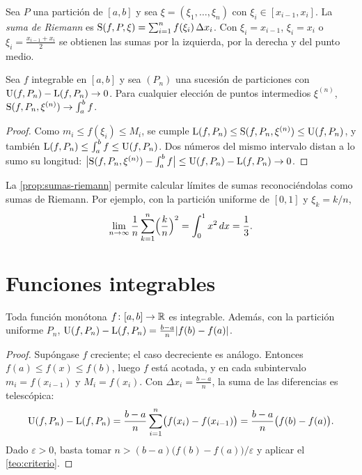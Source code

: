 \begin{definicion}\label{def:suma-riemann}
Sea $P$ una partición de $[a,b]$ y sea $\xi=(\xi_1,\dots,\xi_n)$ con $\xi_i\in[x_{i-1},x_i]$. La \emph{suma de Riemann} es $\operatorname{S}(f,P,\xi)=\sum_{i=1}^{n}f(\xi_i)\,\Delta x_i$. Con $\xi_i=x_{i-1}$, $\xi_i=x_i$ o $\xi_i=\frac{x_{i-1}+x_i}{2}$ se obtienen las sumas por la izquierda, por la derecha y del punto medio.
\end{definicion}

\begin{proposicion}\label{prop:sumas-riemann}
Sea $f$ integrable en $[a,b]$ y sea $(P_n)$ una sucesión de particiones con $\operatorname{U}(f,P_n)-\operatorname{L}(f,P_n)\to0$. Para cualquier elección de puntos intermedios $\xi^{(n)}$, $\operatorname{S}(f,P_n,\xi^{(n)})\to\int_a^b f$.
\end{proposicion}

\begin{proof}
Como $m_i\le f(\xi_i)\le M_i$, se cumple $\operatorname{L}(f,P_n)\le\operatorname{S}(f,P_n,\xi^{(n)})\le\operatorname{U}(f,P_n)$, y también $\operatorname{L}(f,P_n)\le\int_a^b f\le\operatorname{U}(f,P_n)$. Dos números del mismo intervalo distan a lo sumo su longitud: $\bigl|\operatorname{S}(f,P_n,\xi^{(n)})-\int_a^b f\bigr|\le\operatorname{U}(f,P_n)-\operatorname{L}(f,P_n)\to0$.
\end{proof}

La \cref{prop:sumas-riemann} permite calcular límites de sumas reconociéndolas como sumas de Riemann. Por ejemplo, con la partición uniforme de $[0,1]$ y $\xi_k=k/n$,
\[
\lim_{n\to\infty}\frac1n\sum_{k=1}^{n}\Bigl(\frac{k}{n}\Bigr)^{2}=\int_0^1x^{2}\mathop{}\!d x=\frac13 .
\]

\section{Funciones integrables}

\begin{teorema}\label{teo:monotona}
Toda función monótona $f\colon[a,b]\to\mathbb{R}$ es integrable. Además, con la partición uniforme $P_n$, $\operatorname{U}(f,P_n)-\operatorname{L}(f,P_n)=\frac{b-a}{n}\lvert f(b)-f(a)\rvert$.
\end{teorema}

\begin{proof}
Supóngase $f$ creciente; el caso decreciente es análogo. Entonces $f(a)\le f(x)\le f(b)$, luego $f$ está acotada, y en cada subintervalo $m_i=f(x_{i-1})$ y $M_i=f(x_i)$. Con $\Delta x_i=\frac{b-a}{n}$, la suma de las diferencias es telescópica:
\[
\operatorname{U}(f,P_n)-\operatorname{L}(f,P_n)=\frac{b-a}{n}\sum_{i=1}^{n}\bigl(f(x_i)-f(x_{i-1})\bigr)=\frac{b-a}{n}\bigl(f(b)-f(a)\bigr).
\]
Dado $\varepsilon>0$, basta tomar $n>(b-a)\bigl(f(b)-f(a)\bigr)/\varepsilon$ y aplicar el \cref{teo:criterio}.
\end{proof}

